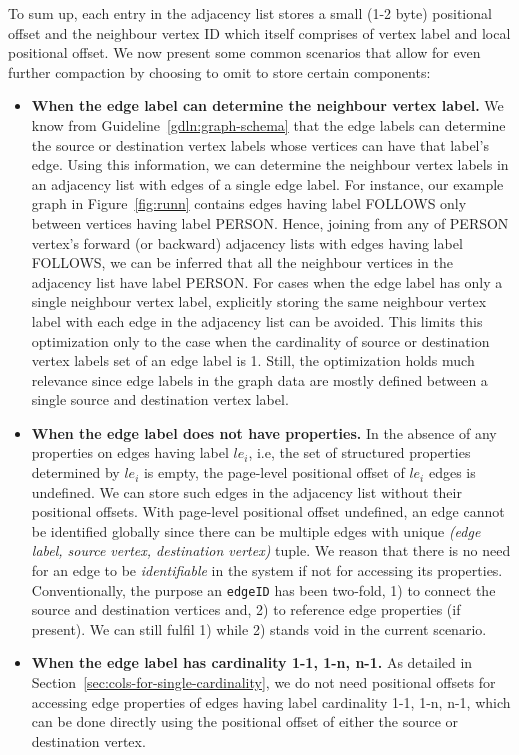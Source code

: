 To sum up, each entry in the adjacency list stores a small (1-2 byte) positional offset and the neighbour vertex ID which itself comprises of vertex label and local positional offset. We now present some common scenarios that allow for even further compaction by choosing to omit to store certain components:

\begin{itemize}
	\item \textbf{When the edge label can determine the neighbour vertex label.} We know from Guideline~\ref{gdln:graph-schema} that the edge labels can determine the source or destination vertex labels whose vertices can have that label's edge. Using this information, we can determine the neighbour vertex labels in an adjacency list with edges of a single edge label. For instance, our example graph in Figure~\ref{fig:runn} contains edges having label FOLLOWS only between vertices having label PERSON. Hence, joining from any of PERSON vertex's forward (or backward) adjacency lists with edges having label FOLLOWS, we can be inferred that all the neighbour vertices in the adjacency list have label PERSON. For cases when the edge label has only a single neighbour vertex label, explicitly storing the same neighbour vertex label with each edge in the adjacency list can be avoided. This limits this optimization only to the case when the cardinality of source or destination vertex labels set of an edge label is 1. Still, the optimization holds much relevance since edge labels in the graph data are mostly defined between a single source and destination vertex label. 
	
	\item \textbf{When the edge label does not have properties.} In the absence of any properties on edges having label $le_i$, i.e, the set of structured properties determined by $le_i$ is empty, the page-level positional offset of $le_i$ edges is undefined. We can store such edges in the adjacency list without their positional offsets. With page-level positional offset undefined, an edge cannot be identified globally since there can be multiple edges with unique \emph{(edge label, source vertex, destination vertex)} tuple. We reason that there is no need for an edge to be \emph{identifiable} in the system if not for accessing its properties. Conventionally, the purpose an  \texttt{edgeID} has been two-fold, 1) to connect the source and destination vertices and, 2) to reference edge properties (if present). We can still fulfil 1) while 2) stands void in the current scenario. 
	
	\item \textbf{When the edge label has cardinality 1-1, 1-n, n-1.} As detailed in Section~\ref{sec:cols-for-single-cardinality}, we do not need positional offsets for accessing edge properties of edges having label cardinality 1-1, 1-n, n-1, which can be done directly using the positional offset of either the source or destination vertex.
	
\end{itemize}

